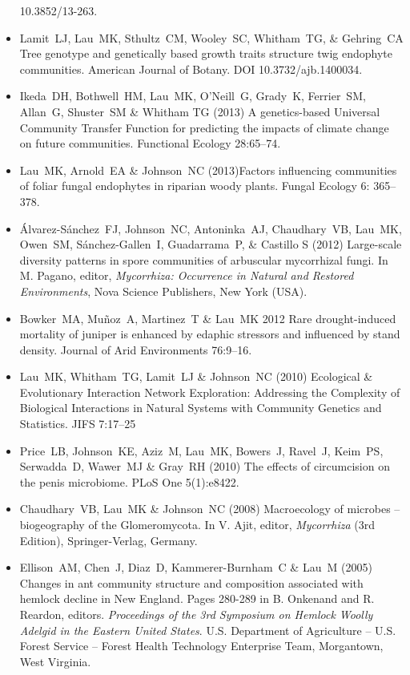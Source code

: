 \documentclass[a4paper]{article}
\begin{document}
\begin{itemize}
  10.3852/13-263.
\item
  Lamit~LJ, Lau~MK, Sthultz~CM, Wooley~SC, Whitham~TG, \& Gehring~CA
  Tree genotype and genetically based growth traits structure twig
  endophyte communities. American Journal of Botany. DOI 10.3732/ajb.1400034.
\item
  Ikeda~DH, Bothwell~HM, Lau~MK, O'Neill~G, Grady~K, Ferrier~SM,
  Allan~G, Shuster~SM \& Whitham TG (2013) A genetics-based Universal
  Community Transfer Function for predicting the impacts of climate
  change on future communities. Functional Ecology 28:65--74.
\item
  Lau~MK, Arnold~EA \& Johnson~NC (2013)Factors influencing communities
  of foliar fungal endophytes in riparian woody plants. Fungal Ecology
  6: 365--378.
\item
  Álvarez-Sánchez~FJ, Johnson~NC, Antoninka~AJ, Chaudhary~VB, Lau~MK,
  Owen~SM, Sánchez-Gallen~I, Guadarrama~P, \& Castillo S (2012)
  Large-scale diversity patterns in spore communities of arbuscular
  mycorrhizal fungi. In M. Pagano, editor, \emph{Mycorrhiza: Occurrence
  in Natural and Restored Environments}, Nova Science Publishers, New
  York (USA).
\item
  Bowker~MA, Muñoz~A, Martinez~T \& Lau~MK 2012 Rare drought-induced
  mortality of juniper is enhanced by edaphic stressors and influenced
  by stand density. Journal of Arid Environments 76:9--16.
\item
  Lau~MK, Whitham~TG, Lamit~LJ \& Johnson~NC (2010) Ecological \&
  Evolutionary Interaction Network Exploration: Addressing the
  Complexity of Biological Interactions in Natural Systems with
  Community Genetics and Statistics. JIFS 7:17--25
\item
  Price~LB, Johnson~KE, Aziz~M, Lau~MK, Bowers~J, Ravel~J, Keim~PS,
  Serwadda~D, Wawer~MJ \& Gray~RH (2010) The effects of circumcision on
  the penis microbiome. PLoS One 5(1):e8422.
\item
  Chaudhary~VB, Lau~MK \& Johnson~NC (2008) Macroecology of microbes --
  biogeography of the Glomeromycota. In V. Ajit, editor,
  \emph{Mycorrhiza} (3rd Edition), Springer-Verlag, Germany.
\item
  Ellison~AM, Chen~J, Diaz~D, Kammerer-Burnham~C \& Lau~M (2005) Changes
  in ant community structure and composition associated with hemlock
  decline in New England. Pages 280-289 in B. Onkenand and R. Reardon,
  editors. \emph{Proceedings of the 3rd Symposium on Hemlock Woolly
  Adelgid in the Eastern United States}. U.S. Department of Agriculture
  -- U.S. Forest Service -- Forest Health Technology Enterprise Team,
  Morgantown, West Virginia.
\end{itemize}
\end{document}
